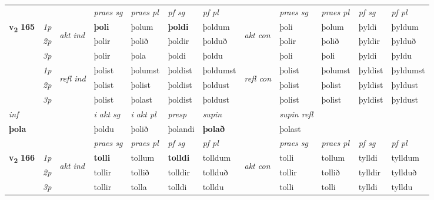 \begin{longtable}[l]{X>{\footnotesize\itshape}llXXXXlXXXX}
\midrule

 & &   & \textit{praes sg}  & \textit{praes pl}    & \textit{ pf sg} & \textit{pf pl} & & \textit{praes sg}  & \textit{praes pl}    & \textit{pf sg} & \textit{pf pl }  \\ \cmidrule{4-7} \cmidrule{9-12}
 \multirow{2}{*}{{{\textbf{v{\textsubscript{2}}} \Large{\textbf{165}}}}}  & 1p & \multirow{3}{*}{\begin{turn}{90}\textit{akt ind}\end{turn}} & \textbf{þoli} & þolum & \textbf{þoldi} & þoldum & \multirow{3}{*}{\begin{turn}{90}\textit{akt con}\end{turn}} &þoli & þolum & þyldi & þyldum\\*
 & 2p &  &  þolir  & þolið & þoldir & þolduð & & þolir & þolið & þyldir & þylduð \\*
 & 3p &  & þolir & þola & þoldi & þoldu & & þoli & þoli& þyldi & þyldu \\*
\cmidrule{4-7} \cmidrule{9-12}
 & 1p & \multirow{3}{*}{\begin{turn}{90}\textit{refl ind}\end{turn}}  & þolist & þolumst & þoldist & þoldumst & \multirow{3}{*}{\begin{turn}{90}\textit{refl con}\end{turn}}  &þolist & þolumst & þyldist & þyldumst \\*
 & 2p &  & þolist & þolist & þoldist & þoldust & &þolist & þolist & þyldist & þyldust \\*
 & 3p  & & þolist & þolast & þoldist & þoldust & & þolist & þolist& þyldist & þyldust \\*
\cmidrule{4-7} \cmidrule{9-12}

   {\textit{inf}} & &  & \textit{i akt sg} & \textit{i akt pl}   & \textit{presp} & \textit{supin} && \textit{supin refl}  \\*
  {\textbf{þola}} & && þoldu  & þolið   & þolandi &  \textbf{þolað} && þolast  \\*

\midrule

 & &   & \textit{praes sg}  & \textit{praes pl}    & \textit{ pf sg} & \textit{pf pl} & & \textit{praes sg}  & \textit{praes pl}    & \textit{pf sg} & \textit{pf pl }  \\ \cmidrule{4-7} \cmidrule{9-12}
 \multirow{2}{*}{{{\textbf{v{\textsubscript{2}}} \Large{\textbf{166}}}}}  & 1p & \multirow{3}{*}{\begin{turn}{90}\textit{akt ind}\end{turn}} & \textbf{tolli} & tollum & \textbf{tolldi} & tolldum & \multirow{3}{*}{\begin{turn}{90}\textit{akt con}\end{turn}} &tolli & tollum & tylldi & tylldum\\*
 & 2p &  &  tollir  & tollið & tolldir & tollduð & & tollir & tollið & tylldir & tyllduð \\*
 & 3p &  & tollir & tolla & tolldi & tolldu & & tolli & tolli& tylldi & tylldu \\*
\cmidrule{4-7} \cmidrule{9-12}


\end{longtable}
